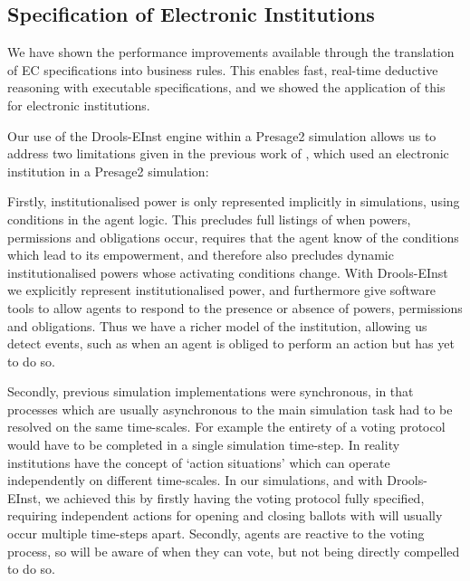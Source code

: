\subsection{Specification of Electronic Institutions}

We have shown the performance improvements available through the translation
of \ac{EC} specifications into business rules. This enables fast, real-time
deductive reasoning with executable specifications, and we showed the
application of this for electronic institutions.

Our use of the Drools-EInst engine within a Presage2 simulation allows us to
address two limitations given in the previous work of \citet{Schaumeier2013},
which used an electronic institution in a Presage2 simulation:

Firstly, institutionalised power is only represented implicitly in simulations,
using conditions in the agent logic. This precludes full listings of when
powers, permissions and obligations occur, requires that the agent know of the
conditions which lead to its empowerment, and therefore also precludes dynamic
institutionalised powers whose activating conditions change. With Drools-EInst
we explicitly represent institutionalised power, and furthermore give software
tools to allow agents to respond to the presence or absence of powers,
permissions and obligations. Thus we have a richer model of the institution,
allowing us detect events, such as when an agent is obliged to perform an
action but has yet to do so.

Secondly, previous simulation implementations were synchronous, in that
processes which are usually asynchronous to the main simulation task had to be
resolved on the same time-scales. For example the entirety of a voting
protocol would have to be completed in a single simulation time-step. In
reality institutions have the concept of `action situations' which can operate
independently on different time-scales. In our simulations, and with Drools-
EInst, we achieved this by firstly having the voting protocol fully specified,
requiring independent actions for opening and closing ballots with will
usually occur multiple time-steps apart. Secondly, agents are reactive to the
voting process, so will be aware of when they can vote, but not being directly
compelled to do so.



